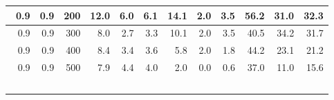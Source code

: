 \begin{longtable}{|r|r|r|r|r|r|r|r|r|r|r|r|}
        \hline \
        0.9                            & 0.9                     & 200                       & 12.0                       & 6.0                       & 6.1                       & 14.1                       & 2.0                       & 3.5                       & 56.2                      & 31.0                      & 32.3                      \\
        \hline \
        0.9                            & 0.9                     & 300                       & 8.0                       & 2.7                       & 3.3                       & 10.1                       & 2.0                       & 3.5                       & 40.5                      & 34.2                      & 31.7                      \\
        \hline \
        0.9                            & 0.9                     & 400                       & 8.4                       & 3.4                       & 3.6                       & 5.8                       & 2.0                       & 1.8                       & 44.2                      & 23.1                      & 21.2                      \\
        \hline \
        0.9                            & 0.9                     & 500                       & 7.9                       & 4.4                       & 4.0                       & 2.0                       & 0.0                       & 0.6                       & 37.0                      & 11.0                      & 15.6                      \\
        \hline \
    \end{longtable}

    \vspace{1em}

%    

